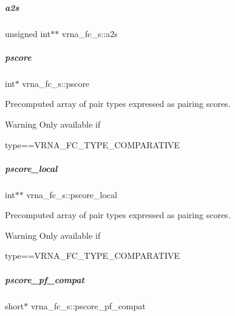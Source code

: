 \mbox{\label{group__fold__compound_a1e8ab3e7d0ba41bdd86e12044903881a}} 
\subparagraph{\texorpdfstring{a2s}{a2s}}
{\footnotesize\ttfamily unsigned int$\ast$$\ast$ vrna\+\_\+fc\+\_\+s\+::a2s}

\mbox{\label{group__fold__compound_a14dc7755af6019ddbd0cf94b209e89dd}} 
\subparagraph{\texorpdfstring{pscore}{pscore}}
{\footnotesize\ttfamily int$\ast$ vrna\+\_\+fc\+\_\+s\+::pscore}



Precomputed array of pair types expressed as pairing scores. 

\begin{DoxyWarning}{Warning}
Only available if\begin{DoxyVerb}type==VRNA_FC_TYPE_COMPARATIVE \end{DoxyVerb}
 
\end{DoxyWarning}
\mbox{\label{group__fold__compound_ad966c15907e6c2e32b0910c7a3154509}} 
\subparagraph{\texorpdfstring{pscore\+\_\+local}{pscore\_local}}
{\footnotesize\ttfamily int$\ast$$\ast$ vrna\+\_\+fc\+\_\+s\+::pscore\+\_\+local}



Precomputed array of pair types expressed as pairing scores. 

\begin{DoxyWarning}{Warning}
Only available if\begin{DoxyVerb}type==VRNA_FC_TYPE_COMPARATIVE \end{DoxyVerb}
 
\end{DoxyWarning}
\mbox{\label{group__fold__compound_abf5e82d14649b6179ae60ed7da6e4fc0}} 
\subparagraph{\texorpdfstring{pscore\+\_\+pf\+\_\+compat}{pscore\_pf\_compat}}
{\footnotesize\ttfamily short$\ast$ vrna\+\_\+fc\+\_\+s\+::pscore\+\_\+pf\+\_\+compat}



